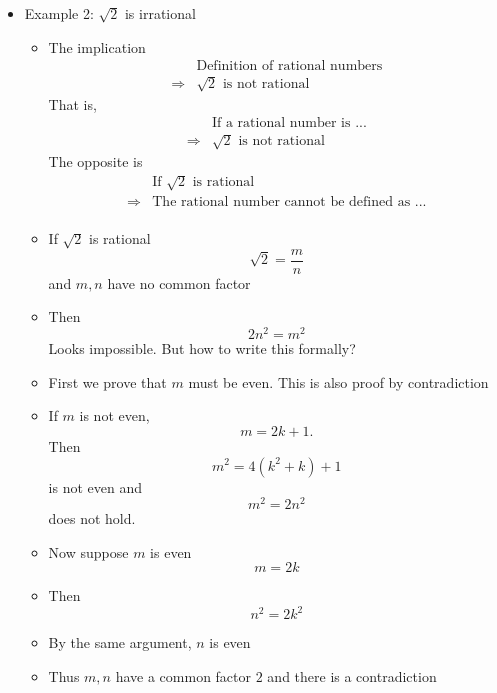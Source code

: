\begin{frame}[allowframebreaks]
\begin{itemize}
\item Example 2: $\sqrt{2}$ is irrational
  \begin{itemize}
  \item The implication
    \begin{equation*}
      \begin{split}
&   \text{Definition of rational numbers}\\
\Rightarrow&  \sqrt{2} \text{ is not rational}
\end{split}
\end{equation*}
That is,
    \begin{equation*}
      \begin{split}
&   \text{If a rational number is ...}\\
\Rightarrow&  \sqrt{2} \text{ is not rational}
\end{split}
\end{equation*}
The opposite is
    \begin{equation*}
      \begin{split}
        &  \text{If $\sqrt{2}$ is rational}
\\
\Rightarrow& \text{The rational number cannot be defined as ...}\\
\end{split}
\end{equation*}
  \item If $\sqrt{2}$ is rational
    \begin{equation*}
      \sqrt{2}=\frac{m}{n}
    \end{equation*}
    and
    $m,n$ have no common factor
  \item Then
    \begin{equation*}
      2n^2=m^2
    \end{equation*}
Looks impossible. But how to write this formally?
\item First we prove that $m$ must be even. This is also proof by
  contradiction
\item [] If $m$ is not even, 
  \begin{equation*}
    m = 2k + 1.
  \end{equation*}
Then
\begin{equation*}
  m^2 = 4(k^2 + k) + 1
\end{equation*}
is not even and
\begin{equation*}
  m^2 = 2n^2
\end{equation*}
does not hold.
\item Now suppose $m$ is even
  $$m=2k$$
\item [] Then
  \begin{equation*}
    n^2 = 2k^2
  \end{equation*}
\item By the same argument, $n$ is even
\item Thus $m, n$ have a common factor $2$ and there
is a contradiction
  \end{itemize}

\end{itemize}\end{frame}



